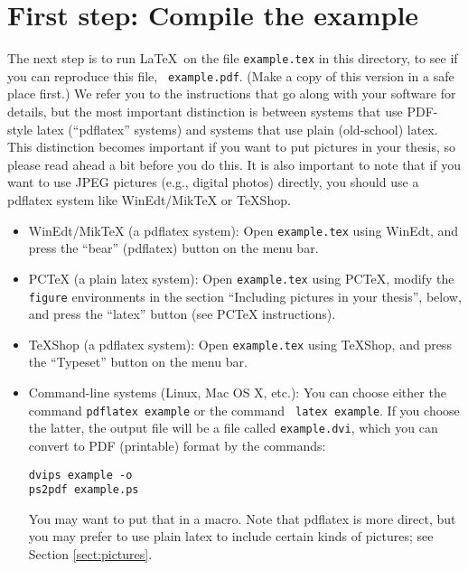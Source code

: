 \documentclass[modernstyle,12pt]{sjsuthesis}
\theoremstyle{definition}
\begin{document}
\section{First step: Compile the example}

The next step is to run \LaTeX\ on the file {\tt example.tex\/} in
this directory, to see if you can reproduce this file, {\tt
  example.pdf}.  (Make a copy of this version in a safe place first.)
We refer you to the instructions that go along with your software for
details, but the most important distinction is between systems that
use PDF-style latex (``pdflatex'' systems) and systems that use plain
(old-school) latex.  This distinction becomes important if you want to
put pictures in your thesis, so please read ahead a bit before you do
this.  It is also important to note that if you want to use JPEG
pictures (e.g., digital photos) directly, you should use a pdflatex
system like WinEdt/MikTeX or TeXShop.

\begin{itemize}
\item WinEdt/MikTeX (a pdflatex system): Open {\tt example.tex\/}
  using WinEdt, and press the ``bear'' (pdflatex) button on the menu
  bar.

\item PCTeX (a plain latex system): Open {\tt example.tex\/} using
  PCTeX, modify the {\tt figure\/} environments in the section
  ``Including pictures in your thesis'', below, and press the
  ``latex'' button (see PCTeX instructions).

\item TeXShop (a pdflatex system): Open {\tt example.tex\/} using
  TeXShop, and press the ``Typeset'' button on the menu bar.

\item Command-line systems (Linux, Mac OS X, etc.): You can choose
  either the command {\tt pdflatex example\/} or the command {\tt
    latex example}.  If you choose the latter, the output file will be
  a file called {\tt example.dvi}, which you can convert to PDF
  (printable) format by the commands:
\begin{verbatim}
dvips example -o
ps2pdf example.ps
\end{verbatim}
  You may want to put that in a macro.  Note that pdflatex is more
  direct, but you may prefer to use plain latex to include certain
  kinds of pictures; see Section \ref{sect:pictures}.
\end{itemize}
\end{document}
